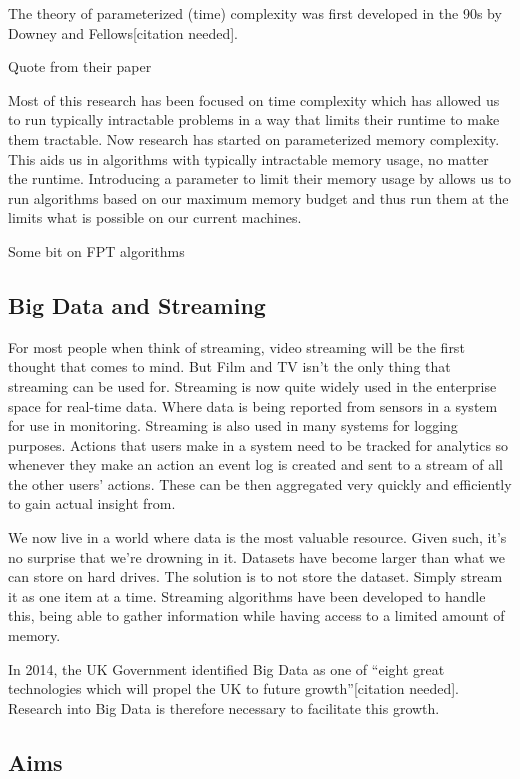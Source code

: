 The theory of parameterized (time) complexity was first developed in the
90s by Downey and Fellows{[}citation needed{]}.

Quote from their paper

Most of this research has been focused on time complexity which has
allowed us to run typically intractable problems in a way that limits
their runtime to make them tractable. Now research has started on
parameterized memory complexity. This aids us in algorithms with
typically intractable memory usage, no matter the runtime. Introducing a
parameter to limit their memory usage by allows us to run algorithms
based on our maximum memory budget and thus run them at the limits what
is possible on our current machines.

Some bit on FPT algorithms

\subsection{Big Data and Streaming}

For most people when think of streaming, video streaming will be the
first thought that comes to mind. But Film and TV isn't the only thing
that streaming can be used for. Streaming is now quite widely used in
the enterprise space for real-time data. Where data is being reported
from sensors in a system for use in monitoring. Streaming is also used
in many systems for logging purposes. Actions that users make in a
system need to be tracked for analytics so whenever they make an action
an event log is created and sent to a stream of all the other users'
actions. These can be then aggregated very quickly and efficiently to
gain actual insight from.

We now live in a world where data is the most valuable resource. Given
such, it's no surprise that we're drowning in it. Datasets have become
larger than what we can store on hard drives. The solution is to not
store the dataset. Simply stream it as one item at a time. Streaming
algorithms have been developed to handle this, being able to gather
information while having access to a limited amount of memory.

In 2014, the UK Government identified Big Data as one of ``eight great
technologies which will propel the UK to future growth''{[}citation
needed{]}. Research into Big Data is therefore necessary to facilitate
this growth.

\subsection{Aims}

